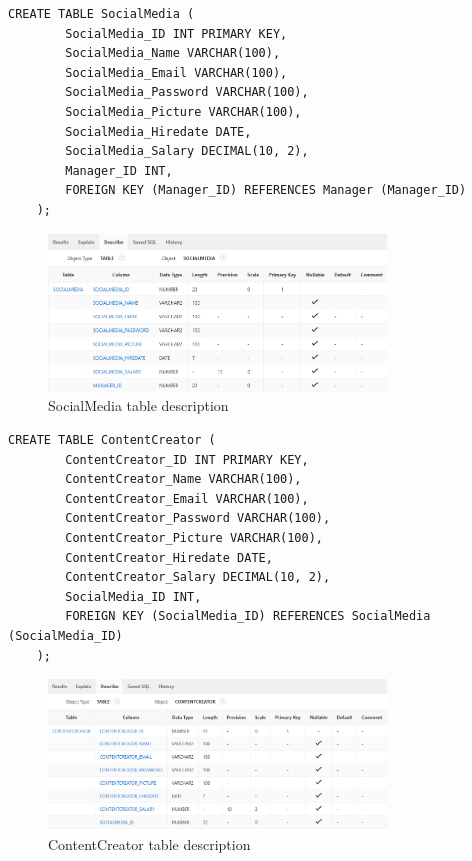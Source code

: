 \begin{lstlisting}[caption={Create SocialMedia table}, label={lst:create_socialmedia}]
    CREATE TABLE SocialMedia (
        SocialMedia_ID INT PRIMARY KEY,
        SocialMedia_Name VARCHAR(100),
        SocialMedia_Email VARCHAR(100),
        SocialMedia_Password VARCHAR(100),
        SocialMedia_Picture VARCHAR(100),
        SocialMedia_Hiredate DATE,
        SocialMedia_Salary DECIMAL(10, 2),
        Manager_ID INT,
        FOREIGN KEY (Manager_ID) REFERENCES Manager (Manager_ID)
    );
    \end{lstlisting}
\begin{figure}[H]
    \centering
    \includegraphics[width=0.8\textwidth]{images/TableDesc/SOCIALMEDIA.png}
    \caption{SocialMedia table description}
    \label{fig:socialmedia_table}
\end{figure}

\begin{lstlisting}[caption={Create ContentCreator table}, label={lst:create_contentcreator}]
    CREATE TABLE ContentCreator (
        ContentCreator_ID INT PRIMARY KEY,
        ContentCreator_Name VARCHAR(100),
        ContentCreator_Email VARCHAR(100),
        ContentCreator_Password VARCHAR(100),
        ContentCreator_Picture VARCHAR(100),
        ContentCreator_Hiredate DATE,
        ContentCreator_Salary DECIMAL(10, 2),
        SocialMedia_ID INT,
        FOREIGN KEY (SocialMedia_ID) REFERENCES SocialMedia (SocialMedia_ID)
    );
    \end{lstlisting}

\begin{figure}[H]
    \centering
    \includegraphics[width=0.8\textwidth]{images/TableDesc/CONTENTCREATOR.png}
    \caption{ContentCreator table description}
    \label{fig:contentcreator_table}
\end{figure}

